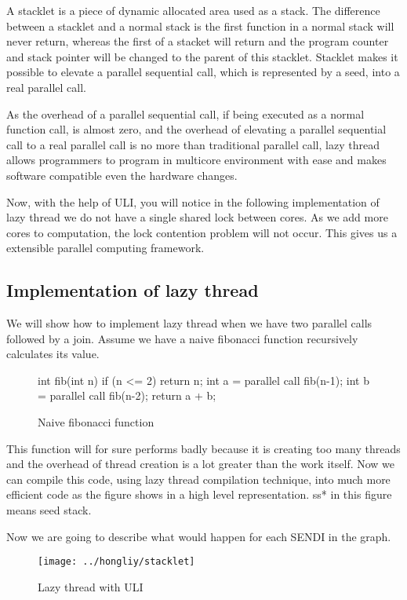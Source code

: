 A stacklet is a piece of dynamic allocated area used as a stack. The difference between a stacklet and a normal stack is the first function in a normal stack will never return, whereas the first of a stacket will return and the program counter and stack pointer will be changed to the parent of this stacklet. Stacklet makes it possible to elevate a parallel sequential call, which is represented by a seed, into a real parallel call.

As the overhead of a parallel sequential call, if being executed as a normal function call, is almost zero, and the overhead of elevating a parallel sequential call to a real parallel call is no more than traditional parallel call, lazy thread allows programmers to program in multicore environment with ease and makes software compatible even the hardware changes.

Now, with the help of ULI, you will notice in the following implementation of lazy thread we do not have a single shared lock between cores. As we add more cores to computation, the lock contention problem will not occur. This gives us a extensible parallel computing framework.

\subsection{Implementation of lazy thread}
We will show how to implement lazy thread when we have two parallel calls followed by a join. Assume we have a naive fibonacci function recursively calculates its value.
\begin{figure}
\begin{code}
int fib(int n) {
    if (n <= 2) return n;
    int a = parallel call fib(n-1);
    int b = parallel call fib(n-2);
    return a + b;
}
\end{code}
\caption{Naive fibonacci function}
\end{figure}

This function will for sure performs badly because it is creating too many threads and the overhead of thread creation is a lot greater than the work itself. Now we can compile this code, using lazy thread compilation technique, into much more efficient code as the figure shows in a high level representation. ss* in this figure means seed stack.

Now we are going to describe what would happen for each SENDI in the graph.

\begin{figure}
\centering
\texttt{[image: ../hongliy/stacklet]}
\caption{Lazy thread with ULI}
\end{figure}

